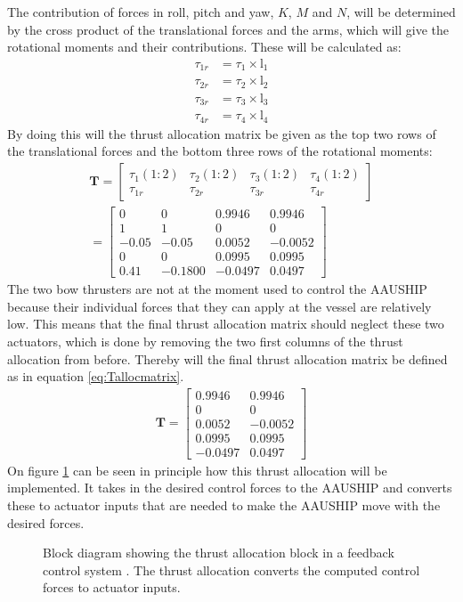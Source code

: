 The contribution of forces in roll, pitch and yaw, $K$, $M$ and $N$, will be determined by the cross product of the translational forces and the arms, which will give the rotational moments and their contributions. These will be calculated as:
\begin{align}
\tau_{1r} &= \tau_1\times \text{l}_1\\
\tau_{2r} &= \tau_2\times \text{l}_2\\
\tau_{3r} &= \tau_3\times \text{l}_3\\
\tau_{4r} &= \tau_4\times \text{l}_4
\end{align}
By doing this will the thrust allocation matrix be given as the top two rows of the translational forces and the bottom three rows of the rotational moments:
\begin{align}
\mathbf{T} =
\begin{bmatrix}
\tau_1(1:2) & \tau_2(1:2) & \tau_3(1:2) & \tau_4(1:2) \\
\tau_{1r} & \tau_{2r} & \tau_{3r} & \tau_{4r}
\end{bmatrix}\\
=
\begin{bmatrix}
0 & 0 & 0.9946 & 0.9946 \\
1 & 1 & 0 & 0 \\
-0.05 & -0.05 & 0.0052 & -0.0052 \\
0 & 0 & 0.0995 & 0.0995 \\
0.41 & -0.1800 & -0.0497 & 0.0497
\end{bmatrix}
\end{align}
The two bow thrusters are not at the moment used to control the AAUSHIP because their individual forces that they can apply at the vessel are relatively low. This means that the final thrust allocation matrix should neglect these two actuators, which is done by removing the two first columns of the thrust allocation from before. Thereby will the final thrust allocation matrix be defined as in equation \ref{eq:Tallocmatrix}.
\begin{align}
\mathbf{T} =
\begin{bmatrix}
0.9946 & 0.9946 \\
0 & 0 \\
0.0052 & -0.0052 \\
0.0995 & 0.0995 \\
-0.0497 & 0.0497
\end{bmatrix}
\label{eq:Tallocmatrix}
\end{align}
On figure \ref{fig:thrust_allocation_block} can be seen in principle how this thrust allocation will be implemented. It takes in the desired control forces to the AAUSHIP and converts these to actuator inputs that are needed to make the AAUSHIP move with the desired forces.
\begin{figure}[htbp]
\centering

\caption{Block diagram showing the thrust allocation block in a
feedback control system \citep[fig.12.25]{fossen}. The thrust
allocation converts the computed control forces to actuator inputs.}
\label{fig:thrust_allocation_block}
\end{figure}